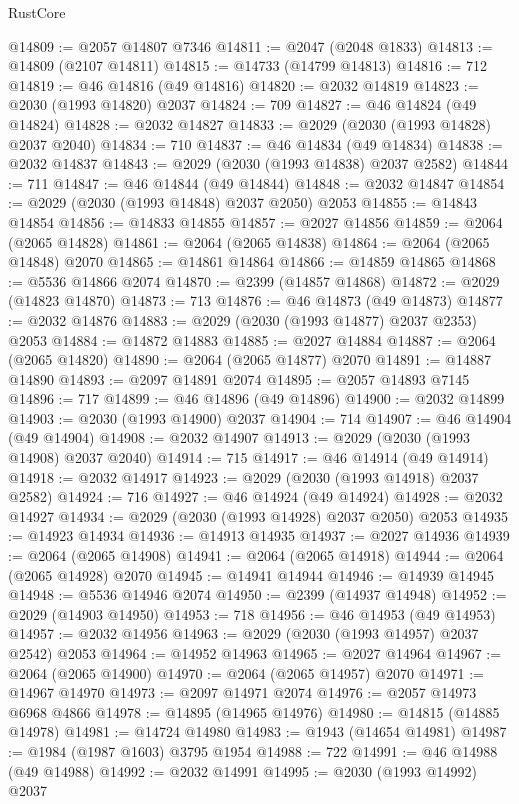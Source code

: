 \begin{lexlean}{RustCore}
\begin{coremodule}
@14809 := @2057 @14807 @7346
@14811 := @2047 (@2048 @1833)
@14813 := @14809 (@2107 @14811)
@14815 := @14733 (@14799 @14813)
@14816 := 712
@14819 := @46 @14816 (@49 @14816)
@14820 := @2032 @14819
@14823 := @2030 (@1993 @14820) @2037
@14824 := 709
@14827 := @46 @14824 (@49 @14824)
@14828 := @2032 @14827
@14833 := @2029 (@2030 (@1993 @14828) @2037 @2040)
@14834 := 710
@14837 := @46 @14834 (@49 @14834)
@14838 := @2032 @14837
@14843 := @2029 (@2030 (@1993 @14838) @2037 @2582)
@14844 := 711
@14847 := @46 @14844 (@49 @14844)
@14848 := @2032 @14847
@14854 := @2029 (@2030 (@1993 @14848) @2037 @2050) @2053
@14855 := @14843 @14854
@14856 := @14833 @14855
@14857 := @2027 @14856
@14859 := @2064 (@2065 @14828)
@14861 := @2064 (@2065 @14838)
@14864 := @2064 (@2065 @14848) @2070
@14865 := @14861 @14864
@14866 := @14859 @14865
@14868 := @5536 @14866 @2074
@14870 := @2399 (@14857 @14868)
@14872 := @2029 (@14823 @14870)
@14873 := 713
@14876 := @46 @14873 (@49 @14873)
@14877 := @2032 @14876
@14883 := @2029 (@2030 (@1993 @14877) @2037 @2353) @2053
@14884 := @14872 @14883
@14885 := @2027 @14884
@14887 := @2064 (@2065 @14820)
@14890 := @2064 (@2065 @14877) @2070
@14891 := @14887 @14890
@14893 := @2097 @14891 @2074
@14895 := @2057 @14893 @7145
@14896 := 717
@14899 := @46 @14896 (@49 @14896)
@14900 := @2032 @14899
@14903 := @2030 (@1993 @14900) @2037
@14904 := 714
@14907 := @46 @14904 (@49 @14904)
@14908 := @2032 @14907
@14913 := @2029 (@2030 (@1993 @14908) @2037 @2040)
@14914 := 715
@14917 := @46 @14914 (@49 @14914)
@14918 := @2032 @14917
@14923 := @2029 (@2030 (@1993 @14918) @2037 @2582)
@14924 := 716
@14927 := @46 @14924 (@49 @14924)
@14928 := @2032 @14927
@14934 := @2029 (@2030 (@1993 @14928) @2037 @2050) @2053
@14935 := @14923 @14934
@14936 := @14913 @14935
@14937 := @2027 @14936
@14939 := @2064 (@2065 @14908)
@14941 := @2064 (@2065 @14918)
@14944 := @2064 (@2065 @14928) @2070
@14945 := @14941 @14944
@14946 := @14939 @14945
@14948 := @5536 @14946 @2074
@14950 := @2399 (@14937 @14948)
@14952 := @2029 (@14903 @14950)
@14953 := 718
@14956 := @46 @14953 (@49 @14953)
@14957 := @2032 @14956
@14963 := @2029 (@2030 (@1993 @14957) @2037 @2542) @2053
@14964 := @14952 @14963
@14965 := @2027 @14964
@14967 := @2064 (@2065 @14900)
@14970 := @2064 (@2065 @14957) @2070
@14971 := @14967 @14970
@14973 := @2097 @14971 @2074
@14976 := @2057 @14973 @6968 @4866
@14978 := @14895 (@14965 @14976)
@14980 := @14815 (@14885 @14978)
@14981 := @14724 @14980
@14983 := @1943 (@14654 @14981)
@14987 := @1984 (@1987 @1603) @3795 @1954
@14988 := 722
@14991 := @46 @14988 (@49 @14988)
@14992 := @2032 @14991
@14995 := @2030 (@1993 @14992) @2037

\end{coremodule}
\end{lexlean}
